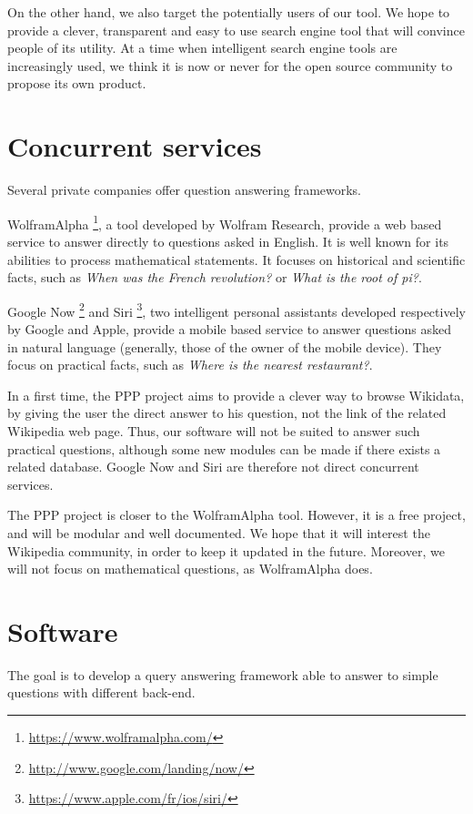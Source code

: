 \documentclass[a4paper,10pt]{article}
\begin{document}
On the other hand, we also target the potentially users of our tool. We hope to provide a clever, transparent and easy to use search engine tool that will convince people of its utility. At a time when intelligent search engine tools are increasingly used, we think it is now or never for the open source community to propose its own product.

\section{Concurrent services}

Several private companies offer question answering frameworks. 

WolframAlpha \footnote{\url{https://www.wolframalpha.com/}}, a tool developed by 
Wolfram Research, provide a web based service to answer directly to questions asked
in English. It is well known for its abilities to process mathematical statements.
It focuses on historical and scientific facts, such as \emph{When was the French 
revolution?} or \emph{What is the root of pi?}.

Google Now \footnote{\url{http://www.google.com/landing/now/}} and Siri
\footnote{\url{https://www.apple.com/fr/ios/siri/}}, two intelligent personal assistants
developed respectively by Google and Apple, provide a mobile based service to 
answer questions asked in natural language (generally, those of the owner of the
mobile device). They focus on practical facts, such as \emph{Where is the nearest
restaurant?}.

In a first time, the PPP project aims to provide a clever way to browse Wikidata, by giving the 
user the direct answer to his question, not the link of the related Wikipedia
web page. Thus, our software will not be suited to answer such practical questions,
although some new modules can be made if there exists a related database. Google Now
and Siri are therefore not direct concurrent services.

The PPP project is closer to the WolframAlpha tool. However, it is a free project,
and will be modular and well documented. We hope that it will interest the 
Wikipedia community, in order to keep it updated in the future. Moreover,
we will not focus on mathematical questions, as WolframAlpha does.

\section{Software}

The goal is to develop a query answering framework able to answer to simple questions with different back-end. 
\end{document}
